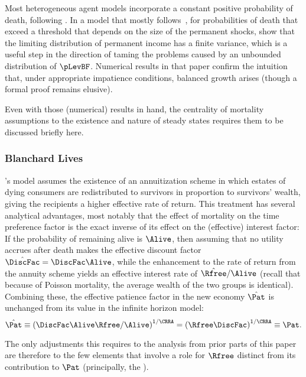 \documentclass[BufferStockTheory]{subfiles}
\begin{document}
Most heterogeneous agent models incorporate a constant positive probability of death, following \cite{blanchardFinite}.  In a model that mostly follows~\cite{blanchardFinite}, for probabilities of death that exceed a threshold that depends on the size of the permanent shocks, \cite{cstwMPC} show that the limiting distribution of permanent income has a finite variance, which is a useful step in the direction of taming the problems caused by an unbounded distribution of $\pLevBF$.  Numerical results in that paper confirm the intuition that, under appropriate impatience conditions, balanced growth arises (though a formal proof remains elusive).

Even with those (numerical) results in hand, the centrality of mortality assumptions to the existence and nature of steady states requires them to be discussed briefly here.

\hypertarget{Blanchard-Lives}{}
\subsubsection{Blanchard Lives}

\cite{blanchardFinite}'s model assumes the existence of an annuitization scheme in which estates of dying consumers are redistributed to survivors in proportion to survivors' wealth, giving the recipients a higher effective rate of return. This treatment has several analytical advantages, most notably that the effect of mortality on the time preference factor is the exact inverse of its effect on the (effective) interest factor:  If the probability of remaining alive is $\Alive$, then assuming that no utility accrues after death makes the effective discount factor $\hat{\DiscFac}=\DiscFac\Alive$, while the enhancement to the rate of return from the annuity scheme yields an effective interest rate of $\hat{\Rfree}/\Alive$ (recall that because of Poisson mortality, the average wealth of the two groups is identical).  Combining these, the effective patience factor in the new economy $\hat{\Pat}$ is unchanged from its value in the infinite horizon model:
\begin{equation}
  \hat{\Pat} \equiv \left(\DiscFac \Alive \Rfree / \Alive\right)^{1/\CRRA} = \left(\Rfree \DiscFac\right)^{1/\CRRA} \equiv \Pat.
\end{equation}

The only adjustments this requires to the analysis from prior parts of this paper are therefore to the few elements that involve a role for $\Rfree$ distinct from its contribution to $\Pat$ (principally, the {\RIC}).  %
\end{document}

